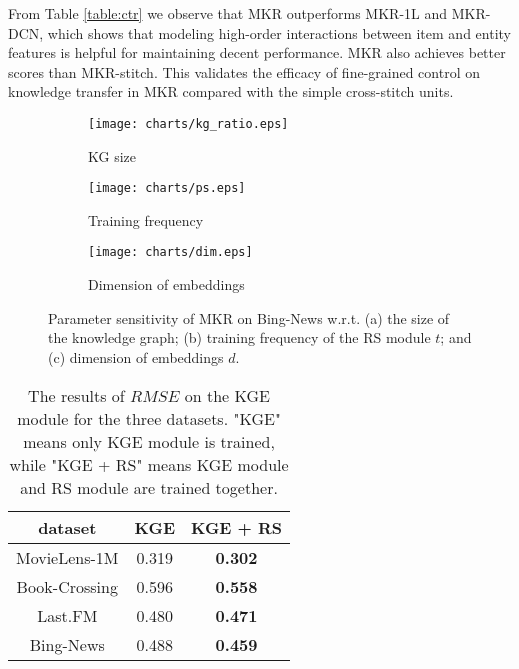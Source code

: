 \documentclass[sigconf]{acmart}
\begin{document}
			From Table \ref{table:ctr} we observe that MKR outperforms MKR-1L and MKR-DCN, which shows that modeling high-order interactions between item and entity features is helpful for maintaining decent performance.
			MKR also achieves better scores than MKR-stitch.
			This validates the efficacy of fine-grained control on knowledge transfer in MKR compared with the simple cross-stitch units.
			
		\begin{figure*}[t]
			\centering
            \begin{subfigure}[b]{0.3\textwidth}
                \texttt{[image: charts/kg\_ratio.eps]}
                \caption{KG size}
                \label{fig:ratio}
            \end{subfigure}
            \hfill
            \begin{subfigure}[b]{0.3\textwidth}
                \texttt{[image: charts/ps.eps]}
                \caption{Training frequency}
                \label{fig:t}
            \end{subfigure}
            \hfill
            \begin{subfigure}[b]{0.3\textwidth}
                \texttt{[image: charts/dim.eps]}
                \caption{Dimension of embeddings}
                \label{fig:dim}
            \end{subfigure}
            \caption{Parameter sensitivity of MKR on Bing-News w.r.t. (a) the size of the knowledge graph; (b) training frequency of the RS module $t$; and (c) dimension of embeddings $d$.}
        \end{figure*}          		
       		
       		
       	\begin{table}[t]
\setlength{\tabcolsep}{10pt}
            \centering
            \caption{The results of $RMSE$ on the KGE module for the three datasets. "KGE" means only KGE module is trained, while "KGE + RS" means KGE module and RS module are trained together.}
            \begin{tabular}{c|cc}
                \hline
                dataset & KGE & KGE + RS \\
                \hline
                MovieLens-1M & 0.319 & \textbf{0.302} \\
                Book-Crossing & 0.596 & \textbf{0.558} \\
                Last.FM & 0.480 & \textbf{0.471}\\
                Bing-News & 0.488 & \textbf{0.459} \\
                \hline
			\end{tabular}
			\label{table:kge}
		\end{table}        
					
\end{document}
